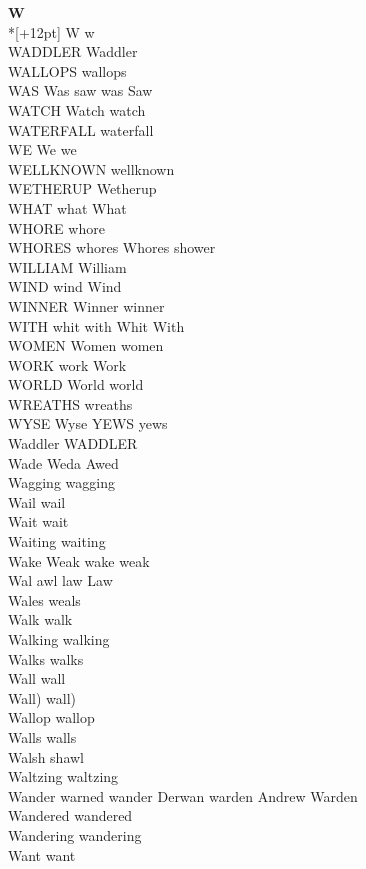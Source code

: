 \vspace{14pt}
\noindent\textbf{\Large W}\\*[+12pt]
W w\\
WADDLER Waddler\\
WALLOPS wallops\\
WAS Was saw was Saw\\
WATCH Watch watch\\
WATERFALL waterfall\\
WE We we\\
WELLKNOWN wellknown\\
WETHERUP Wetherup\\
WHAT what What\\
WHORE whore\\
WHORES whores Whores shower\\
WILLIAM William\\
WIND wind Wind\\
WINNER Winner winner\\
WITH whit with Whit With\\
WOMEN Women women\\
WORK work Work\\
WORLD World world\\
WREATHS wreaths\\
WYSE Wyse YEWS yews\\
Waddler WADDLER\\
Wade Weda Awed\\
Wagging wagging\\
Wail wail\\
Wait wait\\
Waiting waiting\\
Wake Weak wake weak\\
Wal awl law Law\\
Wales weals\\
Walk walk\\
Walking walking\\
Walks walks\\
Wall wall\\
Wall) wall)\\
Wallop wallop\\
Walls walls\\
Walsh shawl\\
Waltzing waltzing\\
Wander warned wander Derwan warden Andrew Warden\\
Wandered wandered\\
Wandering wandering\\
Want want\\
